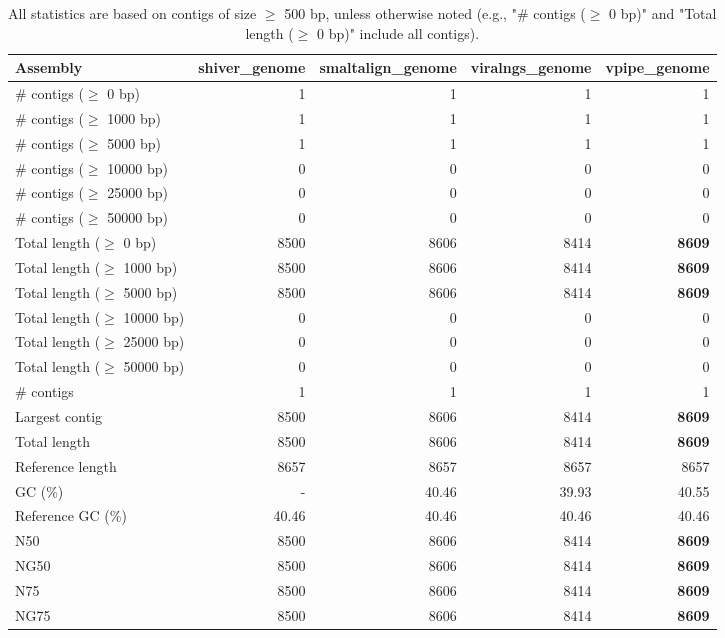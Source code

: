 \documentclass[12pt,a4paper]{article}
\begin{document}
\begin{table}[ht]
\begin{center}
\caption{All statistics are based on contigs of size $\geq$ 500 bp, unless otherwise noted (e.g., "\# contigs ($\geq$ 0 bp)" and "Total length ($\geq$ 0 bp)" include all contigs).}
\begin{tabular}{|l*{4}{|r}|}
\hline
Assembly & shiver\_genome & smaltalign\_genome & viralngs\_genome & vpipe\_genome \\ \hline
\# contigs ($\geq$ 0 bp) & 1 & 1 & 1 & 1 \\ \hline
\# contigs ($\geq$ 1000 bp) & 1 & 1 & 1 & 1 \\ \hline
\# contigs ($\geq$ 5000 bp) & 1 & 1 & 1 & 1 \\ \hline
\# contigs ($\geq$ 10000 bp) & 0 & 0 & 0 & 0 \\ \hline
\# contigs ($\geq$ 25000 bp) & 0 & 0 & 0 & 0 \\ \hline
\# contigs ($\geq$ 50000 bp) & 0 & 0 & 0 & 0 \\ \hline
Total length ($\geq$ 0 bp) & 8500 & 8606 & 8414 & {\bf 8609} \\ \hline
Total length ($\geq$ 1000 bp) & 8500 & 8606 & 8414 & {\bf 8609} \\ \hline
Total length ($\geq$ 5000 bp) & 8500 & 8606 & 8414 & {\bf 8609} \\ \hline
Total length ($\geq$ 10000 bp) & 0 & 0 & 0 & 0 \\ \hline
Total length ($\geq$ 25000 bp) & 0 & 0 & 0 & 0 \\ \hline
Total length ($\geq$ 50000 bp) & 0 & 0 & 0 & 0 \\ \hline
\# contigs & 1 & 1 & 1 & 1 \\ \hline
Largest contig & 8500 & 8606 & 8414 & {\bf 8609} \\ \hline
Total length & 8500 & 8606 & 8414 & {\bf 8609} \\ \hline
Reference length & 8657 & 8657 & 8657 & 8657 \\ \hline
GC (\%) & - & 40.46 & 39.93 & 40.55 \\ \hline
Reference GC (\%) & 40.46 & 40.46 & 40.46 & 40.46 \\ \hline
N50 & 8500 & 8606 & 8414 & {\bf 8609} \\ \hline
NG50 & 8500 & 8606 & 8414 & {\bf 8609} \\ \hline
N75 & 8500 & 8606 & 8414 & {\bf 8609} \\ \hline
NG75 & 8500 & 8606 & 8414 & {\bf 8609} \\ \hline

\end{tabular}
\end{center}
\end{table}
\end{document}
